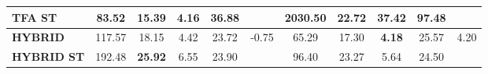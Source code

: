 \documentclass[ecp,tc, english]{iiufrgs}
\begin{document}
\begin{table}[H]
{\begin{tabular}{|l|c|c|c|c|c|c|c|c|c|c|}
\textbf{TFA ST}                   & 83.52            & 15.39          & 4.16           & 36.88          &                                  & \textbf{2030.50} & 22.72          & \textbf{37.42} & \textbf{97.48} &                                  \\ \hline
\textbf{HYBRID}                   & 117.57           & 18.15          & 4.42           & 23.72          & \multirow{2}{*}{-0.75}           & 65.29            & 17.30          & \textbf{4.18}  & 25.57          & \multirow{2}{*}{4.20}            \\ \cline{1-5} \cline{7-10}
\textbf{HYBRID ST}                & 192.48           & \textbf{25.92} & 6.55           & 23.90          &                                  & 96.40            & 23.27          & 5.64           & 24.50          &                                  \\ \hline
\end{tabular}%
}
\end{table}
\end{document}
